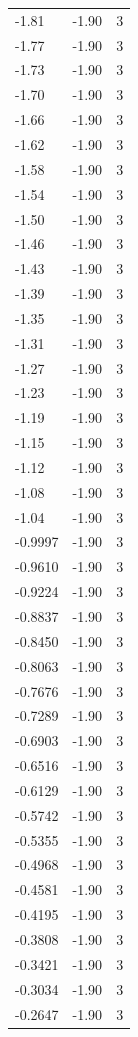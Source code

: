 \begin{longtable}{lrr}
  -1.81 & -1.90 & 3 \\
  -1.77 & -1.90 & 3 \\
  -1.73 & -1.90 & 3 \\
  -1.70 & -1.90 & 3 \\
  -1.66 & -1.90 & 3 \\
  -1.62 & -1.90 & 3 \\
  -1.58 & -1.90 & 3 \\
  -1.54 & -1.90 & 3 \\
  -1.50 & -1.90 & 3 \\
  -1.46 & -1.90 & 3 \\
  -1.43 & -1.90 & 3 \\
  -1.39 & -1.90 & 3 \\
  -1.35 & -1.90 & 3 \\
  -1.31 & -1.90 & 3 \\
  -1.27 & -1.90 & 3 \\
  -1.23 & -1.90 & 3 \\
  -1.19 & -1.90 & 3 \\
  -1.15 & -1.90 & 3 \\
  -1.12 & -1.90 & 3 \\
  -1.08 & -1.90 & 3 \\
  -1.04 & -1.90 & 3 \\
  -0.9997 & -1.90 & 3 \\
  -0.9610 & -1.90 & 3 \\
  -0.9224 & -1.90 & 3 \\
  -0.8837 & -1.90 & 3 \\
  -0.8450 & -1.90 & 3 \\
  -0.8063 & -1.90 & 3 \\
  -0.7676 & -1.90 & 3 \\
  -0.7289 & -1.90 & 3 \\
  -0.6903 & -1.90 & 3 \\
  -0.6516 & -1.90 & 3 \\
  -0.6129 & -1.90 & 3 \\
  -0.5742 & -1.90 & 3 \\
  -0.5355 & -1.90 & 3 \\
  -0.4968 & -1.90 & 3 \\
  -0.4581 & -1.90 & 3 \\
  -0.4195 & -1.90 & 3 \\
  -0.3808 & -1.90 & 3 \\
  -0.3421 & -1.90 & 3 \\
  -0.3034 & -1.90 & 3 \\
  -0.2647 & -1.90 & 3 \\

\end{longtable}
